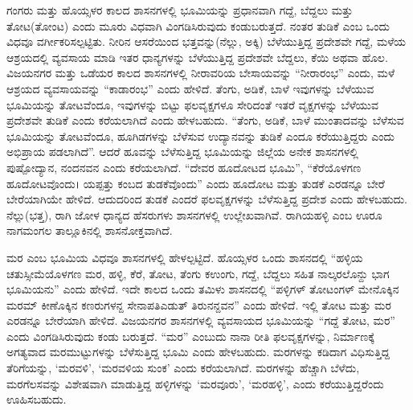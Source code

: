 ಗಂಗರು ಮತ್ತು ಹೊಯ್ಸಳರ ಕಾಲದ ಶಾಸನಗಳಲ್ಲಿ ಭೂಮಿಯನ್ನು ಪ್ರಧಾನವಾಗಿ ಗದ್ದೆ, ಬೆದ್ದಲು ಮತ್ತು ತೋಟ(ತೋಂಟ) ಎಂದು ಮೂರು ವಿಧವಾಗಿ ವಿಂಗಡಿಸಿರುವುದು ಕಂಡುಬರುತ್ತದೆ. ನಂತರ ತುಡಿಕೆ ಎಂಬ ಒಂದು ವಿಧವೂ ವರ್ಗೀಕರಿಸಲ್ಪಟ್ಟಿತು. ನೀರಿನ ಆಸರೆಯಿಂದ ಭತ್ತವನ್ನು(ನೆಲ್ಲು, ಅಕ್ಕಿ) ಬೆಳೆಯುತ್ತಿದ್ದ ಪ್ರದೇಶವೇ ಗದ್ದೆ, ಮಳೆಯ ಆಶ್ರಯದಲ್ಲಿ ವ್ಯವಸಾಯ ಮಾಡಿ ಇತರ ಧಾನ್ಯಗಳನ್ನು ಬೆಳೆಯುತ್ತಿದ್ದ ಪ್ರದೇಶವೇ ಬೆದ್ದಲು, ಕೆಯಿ ಅಥವಾ ಹೊಲ. ವಿಜಯನಗರ ಮತ್ತು ಒಡೆಯರ ಕಾಲದ ಶಾಸನಗಳಲ್ಲಿ ನೀರಾವರಿಯ ಬೇಸಾಯವನ್ನು “ನೀರಾರಂಭ” ಎಂದು, ಮಳೆ ಆಶ್ರಯದ ವ್ಯವಸಾಯವನ್ನು “ಕಾಡಾರಂಭ” ಎಂದು ಹೇಳಿದೆ. ತೆಂಗು, ಅಡಿಕೆ, ಬಾಳೆ ಇವುಗಳನ್ನು ಬೆಳೆಯುವ ಭೂಮಿಯನ್ನು ತೋಟವೆಂದೂ, ಇವುಗಳನ್ನು ಬಿಟ್ಟು ಫಲವೃಕ್ಷಗಳೂ ಸೇರಿದಂತೆ ಇತರೆ ವೃಕ್ಷಗಳನ್ನು ಬೆಳೆಯುವ ಪ್ರದೇಶವೇ ತುಡಿಕೆ ಎಂದು ಕರೆಯಲಾಗಿದೆ ಎಂದು ಹೇಳಬಹುದು. “ತೆಂಗು, ಅಡಿಕೆ, ಬಾಳೆ ಮುಂತಾದವನ್ನು ಬೆಳೆಸುವ ಭೂಮಿಯನ್ನು ತೋಟವೆಂದೂ, ಹೂಗಿಡಗಳನ್ನು ಬೆಳೆಸುವ ಉದ್ಯಾನವನ್ನು ತುಡಿಕೆ ಎಂದೂ ಕರೆಯುತ್ತಿದ್ದರು ಎಂದು ಅಭಿಪ್ರಾಯ ಪಡಲಾಗಿದೆ”. ಆದರೆ ಹೂವನ್ನು ಬೆಳೆಸುತ್ತಿದ್ದ ಭೂಮಿಯನ್ನು ಜಿಲ್ಲೆಯ ಅನೇಕ ಶಾಸನಗಳಲ್ಲಿ ಪುಷ್ಪೋದ್ಯಾನ, ನಂದನವನ ಎಂದು ಕರೆಯಲಾಗಿದೆ. “ದೇವರ ಹೂದೋಟದ ಭೂಮಿ”, “ಕೆರೆಯೊಳಗಣ ಹೂದೋಟವೊಂದು। ಯಪ್ಪತ್ತು ಕಂಬದ ತುಡಕೆವೊಂದು” ಎಂದು ಹೂದೋಟ ಮತ್ತು ತುಡಕೆ ಎರಡನ್ನೂ ಬೇರೆ ಬೇರೆಯಾಗಿಯೇ ಹೇಳಿದೆ. ಆದುದರಿಂದ ತುಡಕೆ ಎಂದರೆ ಫಲವೃಕ್ಷಗಳನ್ನು ಬೆಳೆಸುತ್ತಿದ್ದ ಪ್ರದೇಶ ಎಂದು ಹೇಳಬಹುದು. ನೆಲ್ಲು(ಭತ್ತ), ರಾಗಿ ಜೋಳ ಧಾನ್ಯದ ಹೆಸರುಗಳು ಶಾಸನಗಳಲ್ಲಿ ಉಲ್ಲೇಖವಾಗಿವೆ. ರಾಗಿಯಹಳ್ಳಿ ಎಂಬ ಊರೂ ನಾಗಮಂಗಲ ತಾಲ್ಲೂಕಿನಲ್ಲಿ ಶಾಸನೋಕ್ತವಾಗಿದೆ.

ಮರ ಎಂಬ ಭೂಮಿಯ ವಿಧವೂ ಶಾಸನಗಳಲ್ಲಿ ಹೇಳಲ್ಪಟ್ಟಿದೆ. ಹೊಯ್ಸಳರ ಒಂದು ಶಾಸನದಲ್ಲಿ “ಹಳ್ಳಿಯ ಚತುಸ್ಸೀಮೆ\-ಯೊಳಗಣ ಮರ, ಹಳ್ಳಿ, ಕೆರೆ, ತೋಟ, ತೆಂಗು ಕಉಂಗು, ಗದ್ದೆ, ಬೆದ್ದಲು ಸಹಿತ ನಾಲ್ಕರಲೊನ್ದು ಭಾಗ ಭೂಮಿ\-ಯನು” ಎಂದು ಹೇಳಿದೆ. ಇದೇ ಕಾಲದ ಒಂದು ತಮಿಳು ಶಾಸನದಲ್ಲಿ “ಪಳ್ಳಿಗಳ್​ ತೋಟಂಗಳ್​ ಮೇನೊಕ್ಕಿನ ಮರಮ್ ಕೀಣೊಕ್ಕಿನ ಕಣರುಗಳನ್ದ ಸೇನಾಪತಿಎಡುತ್​ ತಿರುನನ್ದವನ” ಎಂದು ಹೇಳಿದೆ. ಇಲ್ಲಿ ತೋಟ ಮತ್ತು ಮರ ಎರಡನ್ನೂ ಬೇರೆಯಾಗಿ ಹೇಳಿದೆ. ವಿಜಯನಗರ ಶಾಸನಗಳಲ್ಲಿ ವ್ಯವಸಾಯದ ಭೂಮಿಯನ್ನು “ಗದ್ದೆ ತೋಟ, ಮರ” ಎಂದು ವಿಂಗಡಿಸಿರುವುದು ಕಂಡು ಬರುತ್ತದೆ. “ಮರ” ಎಂಬುದು ನಾನಾ ರೀತಿ ಫಲವೃಕ್ಷಗಳನ್ನು, ನಿರ್ಮಾಣಕ್ಕೆ ಅಗತ್ಯವಾದ ಮರಮುಟ್ಟುಗಳನ್ನು ಬೆಳೆಸುತ್ತಿದ್ದ ಭೂಮಿ ಎಂದು ಹೇಳಬಹುದು. ಮರಗಳನ್ನು ಕಡಿದಾಗ ವಿಧಿಸುತ್ತಿದ್ದ ತೆರಿಗೆಯನ್ನು, ‘ಮರವಳಿ’, ‘ಮರವಳಿಯ ಸುಂಕ’ ಎಂದು ಕರೆಯಲಾಗಿದೆ. ಮರಗಳನ್ನು ಹೆಚ್ಚಾಗಿ ಬೆಳೆದು, ಮರಗೆಲಸವನ್ನು ವಿಶೇಷವಾಗಿ ಮಾಡುತ್ತಿದ್ದ ಹಳ್ಳಿಗಳನ್ನು ‘ಮರವೂರು’, ‘ಮರಹಳ್ಳಿ’, ಎಂದು ಕರೆಯುತ್ತಿದ್ದರೆಂದು ಊಹಿಸಬಹುದು.

